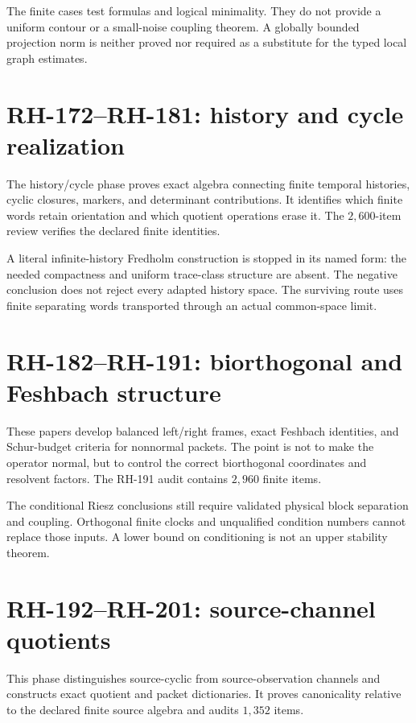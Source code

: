 \documentclass[11pt]{article}
\theoremstyle{definition}
\theoremstyle{remark}
\begin{document}
The finite cases test formulas and logical minimality.  They do not provide a
uniform contour or a small-noise coupling theorem.  A globally bounded
projection norm is neither proved nor required as a substitute for the typed
local graph estimates.

\section{RH-172--RH-181: history and cycle realization}

The history/cycle phase proves exact algebra connecting finite temporal
histories, cyclic closures, markers, and determinant contributions.  It
identifies which finite words retain orientation and which quotient
operations erase it.  The $2{,}600$-item review verifies the declared finite
identities.

A literal infinite-history Fredholm construction is stopped in its named
form: the needed compactness and uniform trace-class structure are absent.
The negative conclusion does not reject every adapted history space.  The
surviving route uses finite separating words transported through an actual
common-space limit.

\section{RH-182--RH-191: biorthogonal and Feshbach structure}

These papers develop balanced left/right frames, exact Feshbach identities,
and Schur-budget criteria for nonnormal packets.  The point is not to make the
operator normal, but to control the correct biorthogonal coordinates and
resolvent factors.  The RH-191 audit contains $2{,}960$ finite items.

The conditional Riesz conclusions still require validated physical block
separation and coupling.  Orthogonal finite clocks and unqualified condition
numbers cannot replace those inputs.  A lower bound on conditioning is not an
upper stability theorem.

\section{RH-192--RH-201: source-channel quotients}

This phase distinguishes source-cyclic from source-observation channels and
constructs exact quotient and packet dictionaries.  It proves canonicality
relative to the declared finite source algebra and audits $1{,}352$ items.
\end{document}
